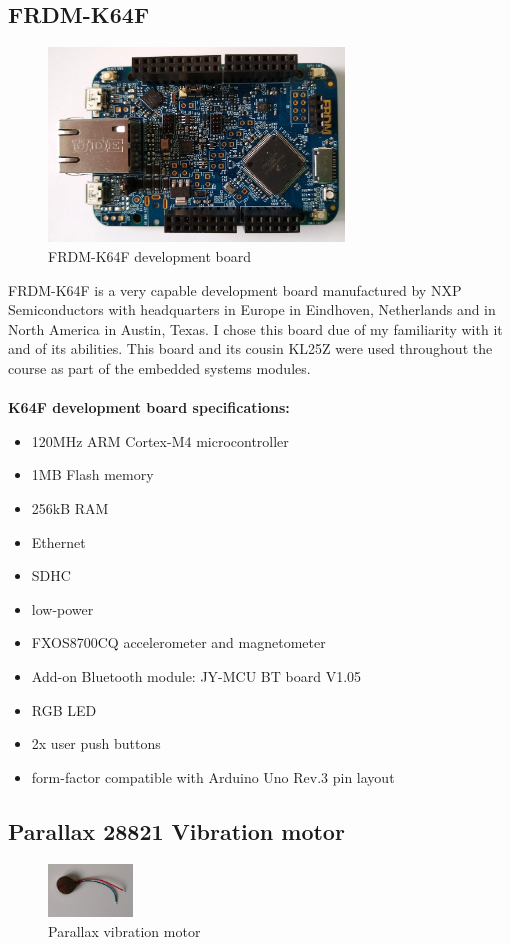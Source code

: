 \documentclass[12pt,a4paper]{article}
\begin{document}
		\subsection{FRDM-K64F}
		\begin{figure}[h]
			\centering
			\includegraphics[width=0.7\textwidth]{k64f1.jpg}\par\vspace{0cm}
			\caption{FRDM-K64F development board}
		\end{figure}
		FRDM-K64F is a very capable development board manufactured by NXP Semiconductors with
		headquarters in Europe in Eindhoven, Netherlands and in North America in Austin, Texas. I chose this board due of my familiarity with it and of its abilities. This board and its cousin KL25Z were used throughout the course as part of the embedded systems modules.\\\\
		{\bfseries K64F development board specifications:}  	
		\begin{itemize}[topsep=4pt,itemsep=1pt]
			\item 120MHz ARM Cortex-M4 microcontroller
			\item 1MB Flash memory
			\item 256kB RAM
			\item Ethernet
			\item SDHC
			\item low-power
			\item FXOS8700CQ accelerometer and magnetometer 
			\item Add-on Bluetooth module: JY-MCU BT board V1.05
			\item RGB LED
			\item 2x user push buttons
			\item form-factor compatible with Arduino Uno Rev.3 pin layout
		\end{itemize}
		
		\subsection{Parallax 28821 Vibration motor}	
		\begin{figure}
			\centering
			\includegraphics[width=0.2\textwidth]{parallax_vib_mot1.jpg}
			\caption{Parallax vibration motor}
		\end{figure}
		
\end{document}
